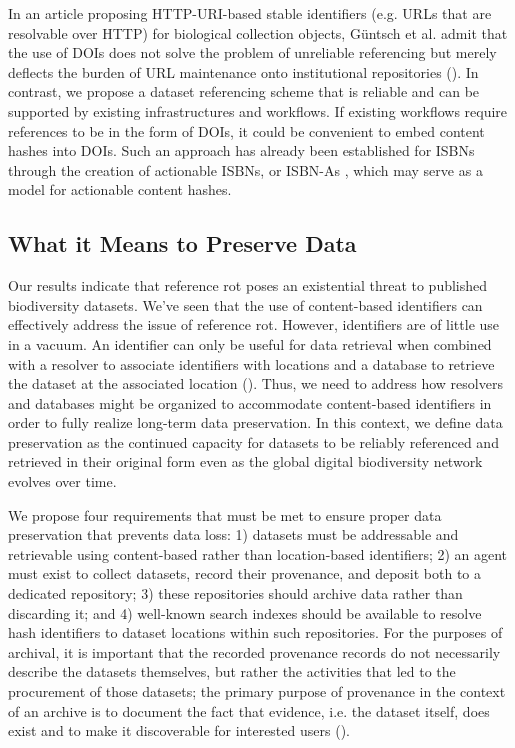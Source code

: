 \documentclass[12pt,letterpaper]{article}
\begin{document}
In an article proposing HTTP-URI-based stable identifiers (e.g. URLs that are resolvable over HTTP) for biological collection objects, Güntsch et al. admit that the use of DOIs does not solve the problem of unreliable referencing but merely deflects the burden of URL maintenance onto institutional repositories (\cite{G_ntsch_2017}). In contrast, we propose a dataset referencing scheme that is reliable and can be supported by existing infrastructures and workflows. If existing workflows require references to be in the form of DOIs, it could be convenient to embed content hashes into DOIs. Such an approach has already been established for ISBNs through the creation of actionable ISBNs, or ISBN-As \cite{Weissberg_2008}, which may serve as a model for actionable content hashes. 

\subsection*{What it Means to Preserve Data} 

Our results indicate that reference rot poses an existential threat to published biodiversity datasets. We’ve seen that the use of content-based identifiers can effectively address the issue of reference rot. However, identifiers are of little use in a vacuum. An identifier can only be useful for data retrieval when combined with a resolver to associate identifiers with locations and a database to retrieve the dataset at the associated location (\cite{Paskin_1999}). Thus, we need to address how resolvers and databases might be organized to accommodate content-based identifiers in order to fully realize long-term data preservation. In this context, we define data preservation as the continued capacity for datasets to be reliably referenced and retrieved in their original form even as the global digital biodiversity network evolves over time. 

We propose four requirements that must be met to ensure proper data preservation that prevents data loss: 1) datasets must be addressable and retrievable using content-based rather than location-based identifiers; 2) an agent must exist to collect datasets, record their provenance, and deposit both to a dedicated repository; 3) these repositories should archive data rather than discarding it; and 4) well-known search indexes should be available to resolve hash identifiers to dataset locations within such repositories. For the purposes of archival, it is important that the recorded provenance records do not necessarily describe the datasets themselves, but rather the activities that led to the procurement of those datasets; the primary purpose of provenance in the context of an archive is to document the fact that evidence, i.e. the dataset itself, does exist and to make it discoverable for interested users (\cite{Bearman_1995}). 
\end{document}
